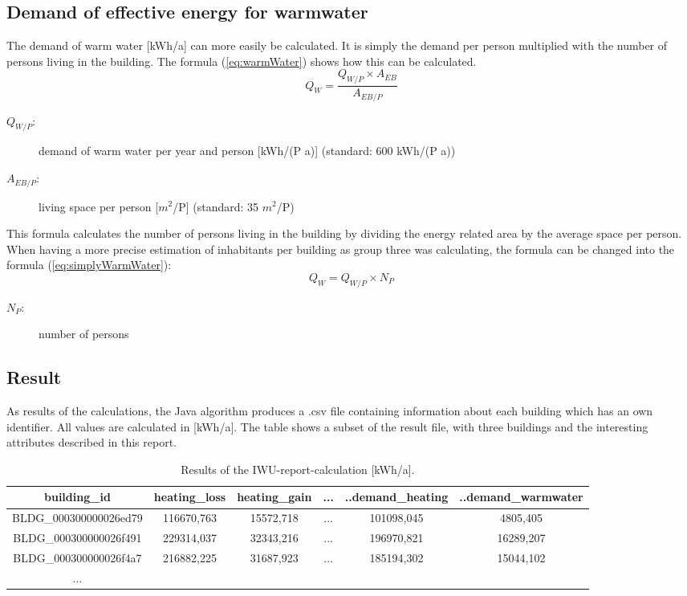 \subsection{Demand of effective energy for warmwater}
The demand of warm water [kWh/a] can more easily be calculated. It is simply the demand per person multiplied with the number of persons living in the building. The formula (\ref{eq:warmWater}) shows how this can be calculated.
\begin{equation}
Q_W = \dfrac{Q_{W/P} \times A_{EB}}{A_{EB/P}}
\label{eq:warmWater}
\end{equation}
\begin{description}
\item[$Q_{W/P} $:] demand of warm water per year and person [kWh/(P a)] (standard: 600 kWh/(P a))\\
\item[$A_{EB/P} $:] living space per person [$m^2$/P] (standard: 35 $m^2$/P)\\
\end{description}
This formula calculates the number of persons living in the building by dividing the energy related area by the average space per person. When having a more precise estimation of inhabitants per building as group three was calculating, the formula can be changed into the formula (\ref{eq:simplyWarmWater}):
\begin{equation}
Q_W = Q_{W/P} \times N_P
\label{eq:simplyWarmWater}
\end{equation}
\begin{description}
\item[$N_P$:] number of persons\\
\end{description}

\subsection{Result}
As results of the calculations, the Java algorithm produces a .csv file containing information about each building which has an own identifier. All values are calculated in [kWh/a]. The table shows a subset of the result file, with three buildings and the interesting attributes described in this report.
\begin{table}[b]
\centering
\begin{tabular}{c  c  c  c  c  c}
building\_id & heating\_loss & heating\_gain & ... & ..demand\_heating & ..demand\_warmwater \\
\hline						
BLDG\_000300000026ed79 & 116670,763	& 15572,718 & ... & 101098,045 & 4805,405\\
BLDG\_000300000026f491 & 229314,037	& 32343,216 & ... & 196970,821 & 16289,207\\
BLDG\_000300000026f4a7 & 216882,225	& 31687,923 & ... & 185194,302 & 15044,102\\
...\\
\end{tabular}
\label{table:result IWU-Report}
\caption{Results of the IWU-report-calculation [kWh/a].} 
\end{table}

